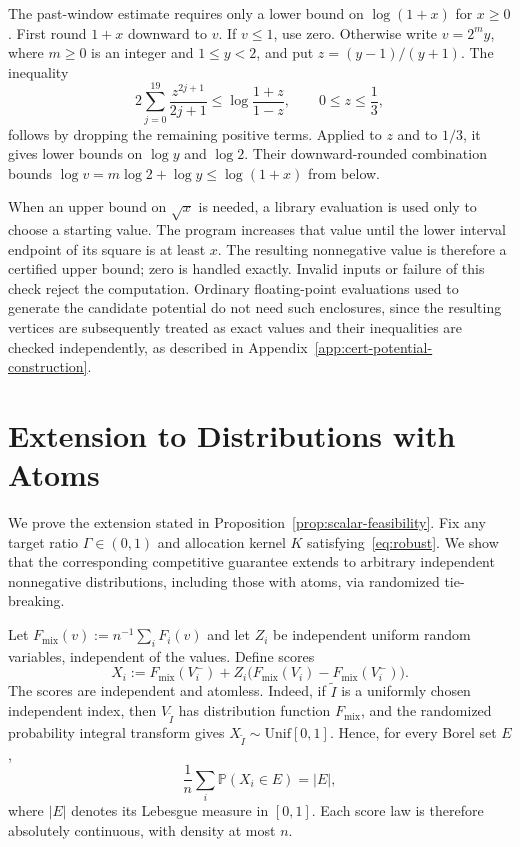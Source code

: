 \documentclass[11pt]{article}
\theoremstyle{definition}
\theoremstyle{remark}
\newcommand{\Pp}{\mathbb P}
\begin{document}
The past-window estimate requires only a lower bound on $\log(1+x)$
for $x\ge0$.  First round $1+x$ downward to $v$.  If $v\le1$, use zero.
Otherwise write $v=2^m y$, where $m\ge0$ is an integer and $1\le y<2$,
and put $z=(y-1)/(y+1)$.  The inequality
\begin{equation}\label{eq:cert-log-arithmetic}
 2\sum_{j=0}^{19}\frac{z^{2j+1}}{2j+1}
 \le\log\frac{1+z}{1-z},\qquad 0\le z\le\frac13,
\end{equation}
follows by dropping the remaining positive terms.
Applied to $z$ and to $1/3$, it gives lower bounds on $\log y$ and
$\log2$.  Their downward-rounded combination bounds
$\log v=m\log2+\log y\le\log(1+x)$ from below.

When an upper bound on $\sqrt{x}$ is needed, a library evaluation is
used only to choose a starting value.  The program increases that value
until the lower interval endpoint of its square is at least $x$.
The resulting nonnegative value is therefore a certified upper bound;
zero is handled exactly.  Invalid inputs or failure of this check
reject the computation.  Ordinary floating-point evaluations used to
generate the candidate potential do not need such enclosures, since
the resulting vertices are subsequently treated as exact values and
their inequalities are checked independently, as described in
Appendix~\ref{app:cert-potential-construction}.

\section{Extension to Distributions with Atoms}\label{app:cert-atoms}

We prove the extension stated in
Proposition~\ref{prop:scalar-feasibility}.
Fix any target ratio $\Gamma\in(0,1)$ and allocation kernel $K$
satisfying~\eqref{eq:robust}.
We show that the corresponding competitive guarantee extends to
arbitrary independent nonnegative distributions, including those
with atoms, via randomized tie-breaking.

Let $F_{\mathrm{mix}}(v):=n^{-1}\sum_iF_i(v)$ and let $Z_i$ be
independent uniform random variables, independent of the values.
Define scores
\begin{equation}\label{eq:cert-distributional-transform}
 X_i:=F_{\mathrm{mix}}(V_i^-)
 +Z_i\bigl(F_{\mathrm{mix}}(V_i)-F_{\mathrm{mix}}(V_i^-)\bigr).
\end{equation}
The scores are independent and atomless.  Indeed, if $\widetilde I$ is a uniformly
chosen independent index, then $V_{\widetilde I}$ has distribution function $F_{\mathrm{mix}}$, and the randomized probability integral transform
gives $X_{\widetilde I}\sim\mathrm{Unif}[0,1]$.  Hence, for every Borel set $E$,
\[
 \frac1n\sum_i\Pp(X_i\in E)=|E|,
\]
where $|E|$ denotes its Lebesgue measure in $[0,1]$.
Each score law is therefore absolutely continuous, with density at most $n$.
\end{document}
